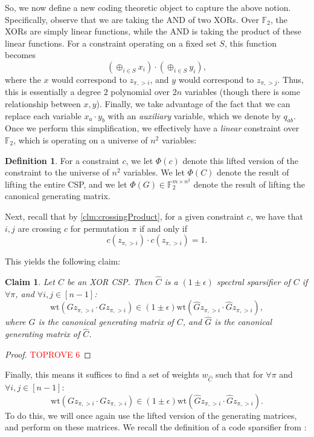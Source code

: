 \documentclass[11pt]{article}
\newtheorem{claim}[theorem]{Claim}
\theoremstyle{definition}
\newtheorem{definition}{Definition}[section]
\newcommand{\F}{\mathbb{F}}
\newcommand{\eps}{\epsilon}
\newcommand{\wt}{\mathrm{wt}}
\begin{document}
So, we now define a new coding theoretic object to capture the above notion. Specifically, observe that we are taking the AND of two XORs. Over $\F_2$, the XORs are simply linear functions, while the AND is taking the product of these linear functions. For a constraint operating on a fixed set $S$, this function becomes 
\[
(\oplus_{i \in S} x_i) \cdot (\oplus_{i \in S} y_i),
\]
where the $x$ would correspond to $z_{\pi, > i}$, and $y$ would correspond to $z_{\pi, > j}$. Thus, this is essentially a degree $2$ polynomial over $2n$ variables (though there is some relationship between $x, y$). Finally, we take advantage of the fact that we can replace each variable $x_a \cdot y_{b}$ with an \emph{auxiliary} variable, which we denote by $q_{ab}$. Once we perform this simplification, we effectively have a \emph{linear} constraint over $\F_2$, which is operating on a universe of $n^2$ variables:

\begin{definition}\label{def:liftedGenerating}
For a constraint $c$, we let $\Phi(c)$ denote this lifted version of the constraint to the universe of $n^2$ variables. We let $\Phi(C)$ denote the result of lifting the entire CSP, and we let $\Phi(G) \in \F_2^{m \times n^2}$ denote the result of lifting the canonical generating matrix. 
\end{definition}

Next, recall that by \cref{clm:crossingProduct}, for a given constraint $c$, we have that $i,j$ are crossing $c$ for permutation $\pi$ if and only if 
\[
c(z_{\pi, > i}) \cdot c(z_{\pi, > i}) = 1.
\]

This yields the following claim:

\begin{claim}\label{clm:preserveAndWeights}
	Let $C$ be an XOR CSP. Then $\hat{C}$ is a $(1 \pm \eps)$ spectral sparsifier of $C$ if $\forall \pi$, and $\forall i, j \in [n-1]$:
	\[
	\wt(Gz_{\pi, > i} \cdot Gz_{\pi, > i}) \in (1 \pm \eps) \wt(\hat{G}z_{\pi, > i} \cdot \hat{G}z_{\pi, > i}),
	\]
	where $G$ is the canonical generating matrix of $C$, and $\hat{G}$ is the canonical generating matrix of $\hat{C}$.
\end{claim}

\begin{proof}\textcolor{red}{TOPROVE 6}\end{proof}

Finally, this means it suffices to find a set of weights $w_{\hat{C}}$ such that for $\forall \pi$ and $\forall i, j \in [n-1]$:
\[
\wt(Gz_{\pi, > i} \cdot Gz_{\pi, > i}) \in (1 \pm \eps) \wt(\hat{G}z_{\pi, > i} \cdot \hat{G}z_{\pi, > i}).
\]
To do this, we will once again use the lifted version of the generating matrices, and perform  on these matrices. We recall the definition of a code sparsifier from \cite{KPS24}:
\end{document}
